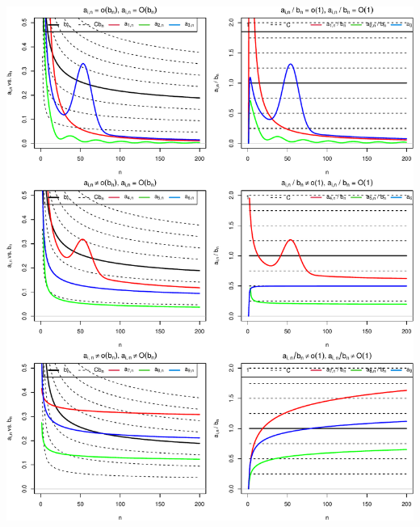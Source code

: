 \documentclass[
  13pt,
  letterpaper,
  DIV=11,
  numbers=noendperiod]{scrreprt}
\theoremstyle{plain}
\theoremstyle{definition}
\theoremstyle{definition}
\theoremstyle{plain}
\theoremstyle{definition}
\theoremstyle{plain}
\theoremstyle{remark}
\begin{document}
\begin{center}
\includegraphics{bigoh_files/figure-pdf/unnamed-chunk-1-1.pdf}
\end{center}
\end{document}
